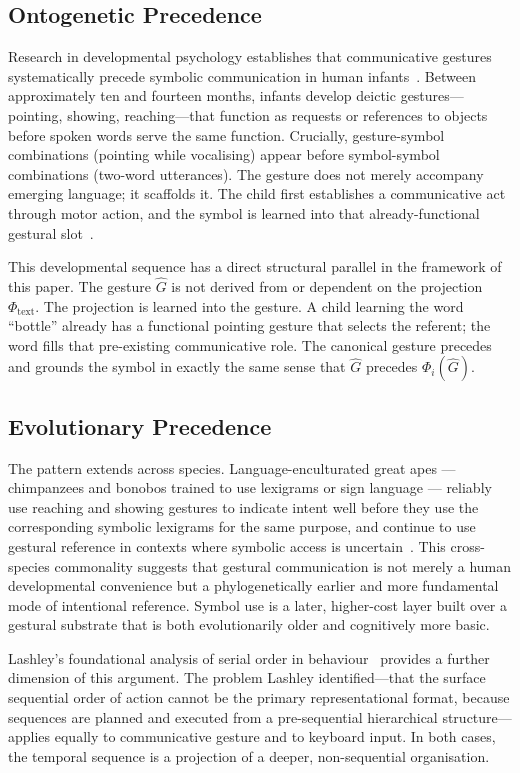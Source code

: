 \documentclass[11pt, a4paper]{article}
\begin{document}
\subsection{Ontogenetic Precedence}

Research in developmental psychology establishes that communicative
gestures systematically precede symbolic communication in human
infants~\cite{iverson2005gesture}. Between approximately ten and fourteen
months, infants develop deictic gestures---pointing, showing,
reaching---that function as requests or references to objects before
spoken words serve the same function. Crucially, gesture-symbol
combinations (pointing while vocalising) appear before symbol-symbol
combinations (two-word utterances). The gesture does not merely
accompany emerging language; it scaffolds it. The child first establishes
a communicative act through motor action, and the symbol is learned into
that already-functional gestural slot~\cite{goldin2003gesture}.

This developmental sequence has a direct structural parallel in the
framework of this paper. The gesture $\hat{G}$ is not derived from or
dependent on the projection $\Phi_{\mathrm{text}}$. The projection is
learned into the gesture. A child learning the word ``bottle'' already
has a functional pointing gesture that selects the referent; the word
fills that pre-existing communicative role. The canonical gesture
precedes and grounds the symbol in exactly the same sense that $\hat{G}$
precedes $\Phi_i(\hat{G})$.

\subsection{Evolutionary Precedence}

The pattern extends across species. Language-enculturated great apes ---
chimpanzees and bonobos trained to use lexigrams or sign language ---
reliably use reaching and showing gestures to indicate intent well before
they use the corresponding symbolic lexigrams for the same purpose, and
continue to use gestural reference in contexts where symbolic access is
uncertain~\cite{savage2000ape}. This cross-species commonality suggests
that gestural communication is not merely a human developmental
convenience but a phylogenetically earlier and more fundamental mode of
intentional reference. Symbol use is a later, higher-cost layer built
over a gestural substrate that is both evolutionarily older and
cognitively more basic.

Lashley's foundational analysis of serial order in behaviour~\cite{lashley1951}
provides a further dimension of this argument. The problem Lashley
identified---that the surface sequential order of action cannot be
the primary representational format, because sequences are planned and
executed from a pre-sequential hierarchical structure---applies equally
to communicative gesture and to keyboard input. In both cases, the
temporal sequence is a projection of a deeper, non-sequential
organisation.
\end{document}

